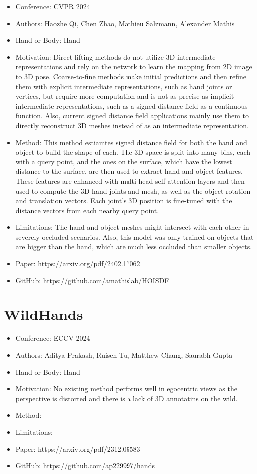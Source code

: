 \documentclass{article}
\begin{document}
\begin{itemize}
    \item Conference: CVPR 2024
    \item Authors: Haozhe Qi, Chen Zhao, Mathieu Salzmann, Alexander Mathis
    \item Hand or Body: Hand
    \item Motivation: Direct lifting methods do not utilize 3D intermediate representations and rely on the network to learn the mapping from 2D image to 3D pose. Coarse-to-fine methods make initial predictions and then refine them with explicit intermediate representations, such as hand joints or vertices, but require more computation and is not as precise as implicit intermediate representations, such as a signed distance field as a continuous function. Also, current signed distance field applications mainly use them to directly reconstruct 3D meshes instead of as an intermediate representation.
    \item Method: This method estiamtes signed distance field for both the hand and object to build the shape of each. The 3D space is split into many bins, each with a query point, and the ones on the surface, which have the lowest distance to the surface, are then used to extract hand and object features. These features are enhanced with multi head self-attention layers and then used to compute the 3D hand joints and mesh, as well as the object rotation and translation vectors. Each joint's 3D position is fine-tuned with the distance vectors from each nearby query point.
    \item Limitations: The hand and object meshes might intersect with each other in severely occluded scenarios. Also, this model was only trained on objects that are bigger than the hand, which are much less occluded than smaller objects.
    \item Paper: https://arxiv.org/pdf/2402.17062
    \item GitHub: https://github.com/amathislab/HOISDF
\end{itemize}

\section*{WildHands}

\begin{itemize}
    \item Conference: ECCV 2024
    \item Authors: Aditya Prakash, Ruisen Tu, Matthew Chang, Saurabh Gupta
    \item Hand or Body: Hand
    \item Motivation: No existing method performs well in egocentric views as the perspective is distorted and there is a lack of 3D annotatins on the wild.
    \item Method: 
    \item Limitations:
    \item Paper: https://arxiv.org/pdf/2312.06583
    \item GitHub: https://github.com/ap229997/hands
\end{itemize}
\end{document}
